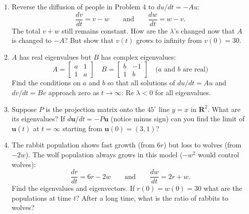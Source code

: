\documentclass[14pt, a4paper]{article}
\begin{document}
\begin{enumerate}
    \item Reverse the diffusion of people in Problem 4 to $du/dt = -Au$:
          \[
              \frac{dv}{dt} = v - w \qquad \text{and} \qquad \frac{dw}{dt} = w - v.
          \]
          The total $v + w$ still remains constant. How are the $\lambda$'s changed now that $A$ is changed to $-A$? But show that $v(t)$ grows to infinity from $v(0) = 30$.

    \item $A$ has real eigenvalues but $B$ has complex eigenvalues:
          \[
              A = \begin{bmatrix} a & 1 \\ 1 & a \end{bmatrix} \quad B = \begin{bmatrix} b & -1 \\ 1 & b \end{bmatrix} \quad \text{($a$ and $b$ are real)}
          \]
          Find the conditions on $a$ and $b$ so that all solutions of $du/dt = Au$ and $dv/dt = Bv$ approach zero as $t \to \infty$: $\text{Re } \lambda < 0$ for all eigenvalues.

    \item Suppose $P$ is the projection matrix onto the $45^\circ$ line $y = x$ in $\mathbf{R}^2$. What are its eigenvalues? If $d\mathbf{u}/dt = -P\mathbf{u}$ (notice minus sign) can you find the limit of $\mathbf{u}(t)$ at $t = \infty$ starting from $\mathbf{u}(0) = (3, 1)$?

    \item The rabbit population shows fast growth (from $6r$) but loss to wolves (from $-2w$). The wolf population always grows in this model ($-w^2$ would control wolves):
          \[
              \frac{dr}{dt} = 6r - 2w \qquad \text{and} \qquad \frac{dw}{dt} = 2r + w.
          \]
          Find the eigenvalues and eigenvectors. If $r(0) = w(0) = 30$ what are the populations at time $t$? After a long time, what is the ratio of rabbits to wolves?


\end{enumerate}
\end{document}
